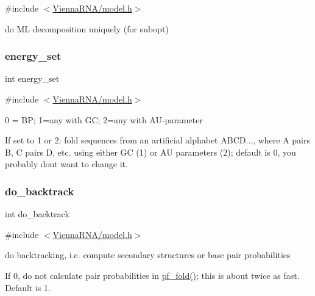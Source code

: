 {\ttfamily \#include $<$\mbox{\hyperlink{model_8h}{Vienna\+R\+N\+A/model.\+h}}$>$}



do ML decomposition uniquely (for subopt) 

\mbox{\label{group__model__details_gafb1ef1166da85092ae8a325e02dcae71}} 
\subsubsection{\texorpdfstring{energy\+\_\+set}{energy\_set}}
{\footnotesize\ttfamily int energy\+\_\+set}



{\ttfamily \#include $<$\mbox{\hyperlink{model_8h}{Vienna\+R\+N\+A/model.\+h}}$>$}



0 = BP; 1=any with GC; 2=any with A\+U-\/parameter 

If set to 1 or 2\+: fold sequences from an artificial alphabet A\+B\+CD..., where A pairs B, C pairs D, etc. using either GC (1) or AU parameters (2); default is 0, you probably don\textquotesingle{}t want to change it. \mbox{\label{group__model__details_gad512b5dd4dbec60faccfe137bb474489}} 
\subsubsection{\texorpdfstring{do\+\_\+backtrack}{do\_backtrack}}
{\footnotesize\ttfamily int do\+\_\+backtrack}



{\ttfamily \#include $<$\mbox{\hyperlink{model_8h}{Vienna\+R\+N\+A/model.\+h}}$>$}



do backtracking, i.\+e. compute secondary structures or base pair probabilities 

If 0, do not calculate pair probabilities in \mbox{\hyperlink{group__pf__fold_gadc3db3d98742427e7001a7fd36ef28c2}{pf\+\_\+fold()}}; this is about twice as fast. Default is 1. \mbox{\label{group__model__details_ga83bdb43472a259c71e69fa9f70f420c3}} 
